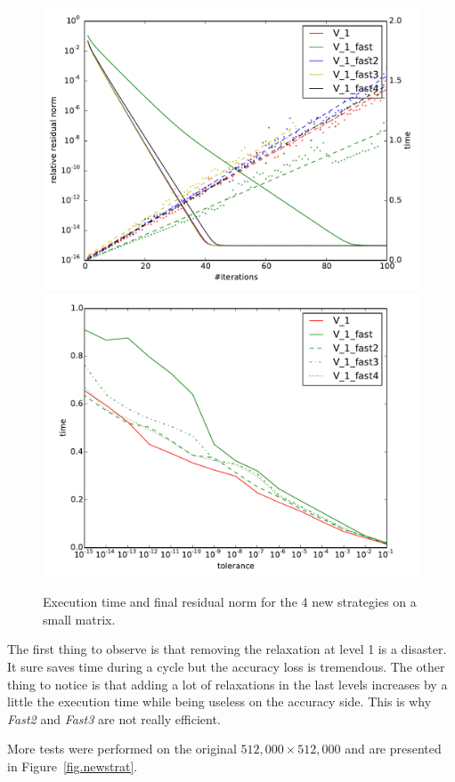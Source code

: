 \documentclass[sigplan]{acmart}
\begin{document}
  \begin{figure}
  \includegraphics[width=0.49\linewidth]{figs/convergence_fast_small.pdf}
   \includegraphics[width=0.49\linewidth]{figs/time_convergence_fast_small.pdf}
   \caption{Execution time and final residual norm for the 4 new strategies on a small matrix.}
   \label{fig.newstrat_small}
  \end{figure}

  The first thing to observe is that removing the relaxation at level 1 is a disaster. It sure saves time during a cycle but the accuracy loss is tremendous.
  The other thing to notice is that adding a lot of relaxations in the last levels increases by a little the execution time while being useless on the accuracy side. This is why \emph{Fast2} and  \emph{Fast3} are not really efficient.
  
  More tests were performed on the original $512,000\times 512,000$ and are presented in Figure~\ref{fig.newstrat}.
  
\end{document}
